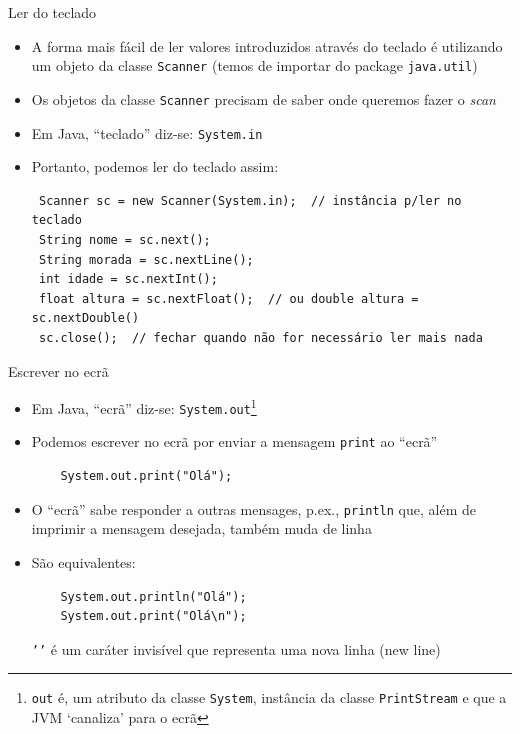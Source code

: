 \documentclass[portuguese, aspectratio=169, xcolor=table]{beamer}
\begin{document}
\begin{frame}[fragile]{Ler do teclado}
\begin{itemize}
    \item A forma mais fácil de ler valores introduzidos através do teclado é utilizando um objeto da classe \texttt{Scanner} (temos de importar do package \texttt{java.util})
    \item Os objetos da classe \texttt{Scanner} precisam de saber onde queremos fazer o \textit{scan}
    \item Em Java, ``teclado'' diz-se: \texttt{System.in}
    \item Portanto, podemos ler do teclado assim:
\begin{verbatim}
 Scanner sc = new Scanner(System.in);  // instância p/ler no teclado
 String nome = sc.next();
 String morada = sc.nextLine();
 int idade = sc.nextInt();
 float altura = sc.nextFloat();  // ou double altura = sc.nextDouble()
 sc.close();  // fechar quando não for necessário ler mais nada
\end{verbatim}
\end{itemize}
\end{frame}

\begin{frame}[fragile]{Escrever no ecrã}
\begin{itemize}
    \item Em Java, ``ecrã'' diz-se: \texttt{System.out}\footnote{\texttt{out} é, um atributo da classe \texttt{System}, instância da classe \texttt{PrintStream} e que a JVM `canaliza' para o ecrã} 
    \item Podemos escrever no ecrã por enviar a mensagem \texttt{print} ao ``ecrã''
\begin{verbatim}
    System.out.print("Olá");
\end{verbatim}
\item O ``ecrã'' sabe responder a outras mensages, p.ex., \texttt{println} que, além de imprimir a mensagem desejada, também muda de linha
\item São equivalentes:
\begin{verbatim}
    System.out.println("Olá");
    System.out.print("Olá\n");
\end{verbatim}
\texttt{'\n'} é um caráter invisível que representa uma nova linha (new line)
\end{itemize}
\end{frame}
\end{document}
